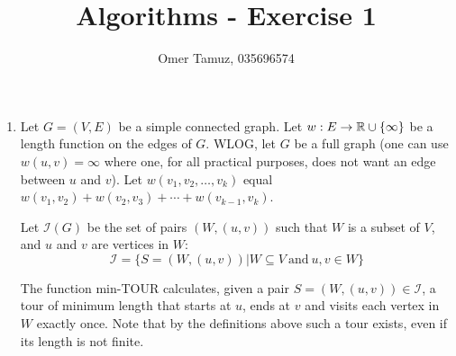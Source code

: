 \documentclass[11pt]{article} \usepackage{amssymb}
\begin{document}
\title{Algorithms - Exercise 1}

 \author{Omer Tamuz, 035696574}
\maketitle


\begin{enumerate}
  \item 
    Let $G=(V,E)$ be a simple connected graph. Let $w:E\to \mathbb R\cup\{\infty\}$ be a length
    function on the edges of $G$. WLOG, let $G$ be a full graph (one can use
    $w(u,v)=\infty$ where one, for all practical purposes, does not want an 
    edge between $u$ and $v$).
    Let $w(v_1,v_2,\ldots,v_k)$ equal 
    $w(v_1,v_2)+w(v_2,v_3)+\cdots+w(v_{k-1},v_k)$.
    
    Let $\mathcal{I}(G)$ be the set of pairs $(W,(u,v))$ such that $W$ is a 
    subset of $V$, and $u$ and $v$ are vertices in $W$:
    \begin{equation*}
      \mathcal{I}=\{S = (W,(u,v))|W\subseteq V\: \textrm{and}\: u,v\in W\}
    \end{equation*}

    The function min-TOUR calculates, given a pair 
    $S=(W,(u,v))\in \mathcal{I}$, a tour of minimum length that starts at 
    $u$, ends at $v$
    and visits each vertex in $W$ exactly once. 
    Note that by the definitions above
    such a tour exists, even if its length is not finite.

    \begin{algorithmic}
      \ELSE
          \ENDIF
         
        \ENDFOR
      \ENDIF
    \end{algorithmic}
    

\end{enumerate}
\end{document}
